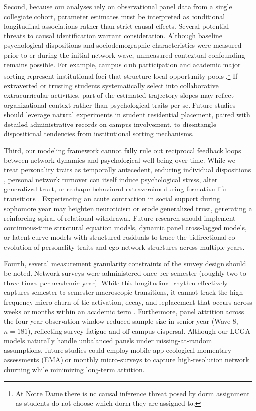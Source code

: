 \documentclass[12pt]{article}
\begin{document}
Second, because our analyses rely on observational panel data from a single collegiate cohort, parameter estimates must be interpreted as conditional longitudinal associations rather than strict causal effects. Several potential threats to causal identification warrant consideration. Although baseline psychological dispositions and sociodemographic characteristics were measured prior to or during the initial network wave, unmeasured contextual confounding remains possible. For example, campus club participation and academic major sorting represent institutional foci that structure local opportunity pools \citep{feld1982social, small2009unanticipated}.\footnote{At Notre Dame there is no causal inference threat posed by dorm assignment as students do not choose which dorm they are assigned to.} If extraverted or trusting students systematically select into collaborative extracurricular activities, part of the estimated trajectory slopes may reflect organizational context rather than psychological traits per se. Future studies should leverage natural experiments in student residential placement, paired with detailed administrative records on campus involvement, to disentangle dispositional tendencies from institutional sorting mechanisms.

Third, our modeling framework cannot fully rule out reciprocal feedback loops between network dynamics and psychological well-being over time. While we treat personality traits as temporally antecedent, enduring individual dispositions \citep{costa1992four, john1999big}, personal network turnover can itself induce psychological stress, alter generalized trust, or reshape behavioral extraversion during formative life transitions \citep{asendorpf1998personality, russell2008personality}. Experiencing an acute contraction in social support during sophomore year may heighten neuroticism or erode generalized trust, generating a reinforcing spiral of relational withdrawal. Future research should implement continuous-time structural equation models, dynamic panel cross-lagged models, or latent curve models with structured residuals to trace the bidirectional co-evolution of personality traits and ego network structures across multiple years.

Fourth, several measurement granularity constraints of the survey design should be noted. Network surveys were administered once per semester (roughly two to three times per academic year). While this longitudinal rhythm effectively captures semester-to-semester macroscopic transitions, it cannot track the high-frequency micro-churn of tie activation, decay, and replacement that occurs across weeks or months within an academic term \citep{saramaki2014persistence, heydari2018multichannel}. Furthermore, panel attrition across the four-year observation window reduced sample size in senior year (Wave 8, $n = 181$), reflecting survey fatigue and off-campus dispersal. Although our LCGA models naturally handle unbalanced panels under missing-at-random assumptions, future studies could employ mobile-app ecological momentary assessments (EMA) or monthly micro-surveys to capture high-resolution network churning while minimizing long-term attrition.
\end{document}
